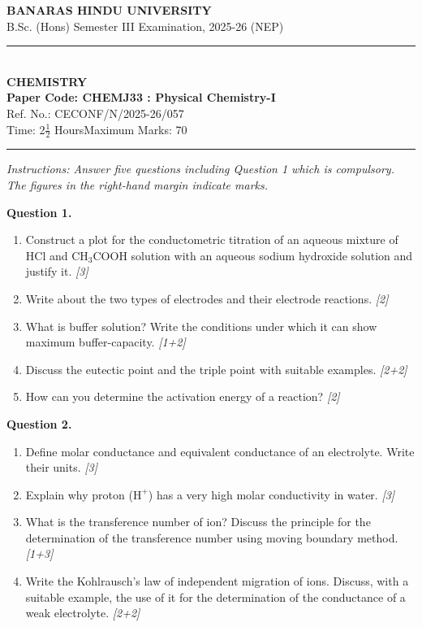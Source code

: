 \documentclass[11pt,a4paper]{article}
\newcommand{\pts}[1]{\hfill \textit{[#1]}}
\begin{document}
\begin{center}
  {\large\bfseries BANARAS HINDU UNIVERSITY}\\[2pt]
  {\normalsize B.Sc. (Hons) Semester III Examination, 2025-26 (NEP)}\\[6pt]
  \rule{0.8\linewidth}{0.5pt}\\[6pt]
  {\large\bfseries CHEMISTRY}\\[4pt]
  {\large\bfseries Paper Code: CHEMJ33 : Physical Chemistry-I}\\[2pt]
  {\small Ref. No.: CECONF/N/2025-26/057}\\[4pt]
  {\normalsize Time: 2$\frac{1}{2}$ Hours\hfill Maximum Marks: 70}
\end{center}

\rule{\linewidth}{0.4pt}

\smallskip

\noindent \textit{Instructions: Answer five questions including Question 1 which is compulsory. The figures in the right-hand margin indicate marks.}

\bigskip

\noindent \textbf{Question 1.}
\begin{enumerate}[label=(\alph*)]
  \item Construct a plot for the conductometric titration of an aqueous mixture of HCl and $\text{CH}_3\text{COOH}$ solution with an aqueous sodium hydroxide solution and justify it. \pts{3}
  \item Write about the two types of electrodes and their electrode reactions. \pts{2}
  \item What is buffer solution? Write the conditions under which it can show maximum buffer-capacity. \pts{1+2}
  \item Discuss the eutectic point and the triple point with suitable examples. \pts{2+2}
  \item How can you determine the activation energy of a reaction? \pts{2}
\end{enumerate}

\bigskip

\noindent \textbf{Question 2.}
\begin{enumerate}[label=(\alph*)]
  \item Define molar conductance and equivalent conductance of an electrolyte. Write their units. \pts{3}
  \item Explain why proton ($\text{H}^+$) has a very high molar conductivity in water. \pts{3}
  \item What is the transference number of ion? Discuss the principle for the determination of the transference number using moving boundary method. \pts{1+3}
  \item Write the Kohlrausch's law of independent migration of ions. Discuss, with a suitable example, the use of it for the determination of the conductance of a weak electrolyte. \pts{2+2}
\end{enumerate}
\end{document}
